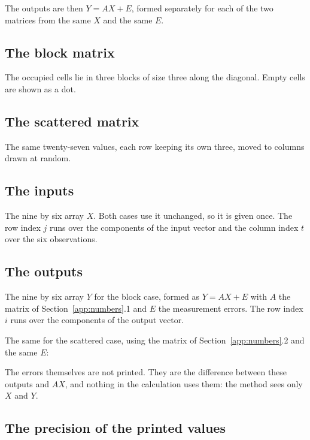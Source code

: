 The outputs are then $Y = AX + E$, formed separately for each of the two matrices from
the same $X$ and the same $E$.

\subsection{The block matrix}

The occupied cells lie in three blocks of size three along the diagonal. Empty cells
are shown as a dot.



\subsection{The scattered matrix}

The same twenty-seven values, each row keeping its own three, moved to columns drawn
at random.



\subsection{The inputs}

The nine by six array $X$. Both cases use it unchanged, so it is given once. The row
index $j$ runs over the components of the input vector and the column index $t$ over
the six observations.



\subsection{The outputs}

The nine by six array $Y$ for the block case, formed as $Y = AX + E$ with $A$ the
matrix of Section~\ref{app:numbers}.1 and $E$ the measurement errors. The row index
$i$ runs over the components of the output vector.



The same for the scattered case, using the matrix of
Section~\ref{app:numbers}.2 and the same $E$:



The errors themselves are not printed. They are the difference between these outputs
and $AX$, and nothing in the calculation uses them: the method sees only $X$ and $Y$.

\subsection{The precision of the printed values}

